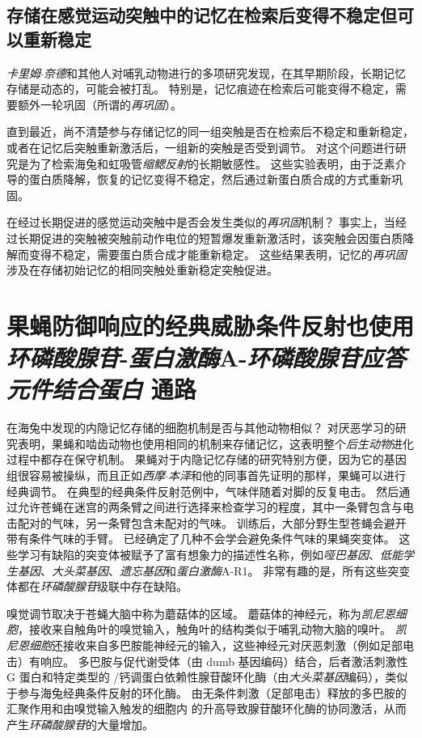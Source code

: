 \subsection{存储在感觉运动突触中的记忆在检索后变得不稳定但可以重新稳定}

\textit{卡里姆$\cdot$奈德}和其他人对哺乳动物进行的多项研究发现，在其早期阶段，长期记忆存储是动态的，可能会被打乱。
特别是，记忆痕迹在检索后可能变得不稳定，需要额外一轮巩固（所谓的\textit{再巩固}）。


直到最近，尚不清楚参与存储记忆的同一组突触是否在检索后不稳定和重新稳定，或者在记忆后突触重新激活后，一组新的突触是否受到调节。
对这个问题进行研究是为了检索海兔和虹吸管\textit{缩鳃反射}的长期敏感性。
这些实验表明，由于泛素介导的蛋白质降解，恢复的记忆变得不稳定，然后通过新蛋白质合成的方式重新巩固。


在经过长期促进的感觉运动突触中是否会发生类似的\textit{再巩固}机制？
事实上，当经过长期促进的突触被突触前动作电位的短暂爆发重新激活时，该突触会因蛋白质降解而变得不稳定，需要蛋白质合成才能重新稳定。
这些结果表明，记忆的\textit{再巩固}涉及在存储初始记忆的相同突触处重新稳定突触促进。



\section{果蝇防御响应的经典威胁条件反射也使用\textit{环磷酸腺苷}-\textit{蛋白激酶}A-\textit{环磷酸腺苷应答元件结合蛋白} 通路}

在海兔中发现的内隐记忆存储的细胞机制是否与其他动物相似？
对厌恶学习的研究表明，果蝇和啮齿动物也使用相同的机制来存储记忆，这表明整个\textit{后生动物}进化过程中都存在保守机制。
果蝇对于内隐记忆存储的研究特别方便，因为它的基因组很容易被操纵，而且正如\textit{西摩$\cdot$本泽}和他的同事首先证明的那样，果蝇可以进行经典调节。
在典型的经典条件反射范例中，气味伴随着对脚的反复电击。
然后通过允许苍蝇在迷宫的两条臂之间进行选择来检查学习的程度，其中一条臂包含与电击配对的气味，另一条臂包含未配对的气味。
训练后，大部分野生型苍蝇会避开带有条件气味的手臂。
已经确定了几种不会学会避免条件气味的果蝇突变体。
这些学习有缺陷的突变体被赋予了富有想象力的描述性名称，例如\textit{哑巴基因}、\textit{低能学生基因}、\textit{大头菜基因}、\textit{遗忘基因}和\textit{蛋白激酶}A-R1。
非常有趣的是，所有这些突变体都在\textit{环磷酸腺苷}级联中存在缺陷。


嗅觉调节取决于苍蝇大脑中称为蘑菇体的区域。
蘑菇体的神经元，称为\textit{凯尼恩细胞}，接收来自触角叶的嗅觉输入，触角叶的结构类似于哺乳动物大脑的嗅叶。
\textit{凯尼恩细胞}还接收来自多巴胺能神经元的输入，这些神经元对厌恶刺激（例如足部电击）有响应。
多巴胺与促代谢受体（由 dumb 基因编码）结合，后者激活刺激性 G 蛋白和特定类型的 /钙调蛋白依赖性腺苷酸环化酶（由\textit{大头菜基因}编码），类似于参与海兔经典条件反射的环化酶。
由无条件刺激（足部电击）释放的多巴胺的汇聚作用和由嗅觉输入触发的细胞内  的升高导致腺苷酸环化酶的协同激活，从而产生\textit{环磷酸腺苷}的大量增加。


